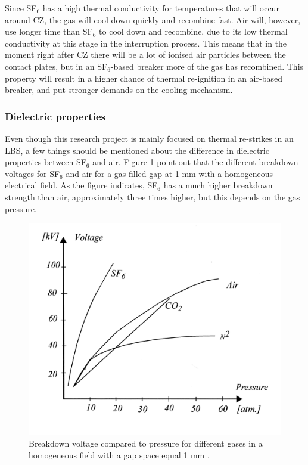 \documentclass[10pt,a4paper,twoside]{article}
\begin{document}
Since SF${_6}$ has a high thermal conductivity for temperatures that will occur around CZ, the gas will cool down quickly and recombine fast. Air will, however, use longer time than SF${_6}$ to cool down and recombine, due to its low thermal conductivity at this stage in the interruption process. This means that in the moment right after CZ there will be a lot of ionised air particles between the contact plates, but in an SF${_6}$-based breaker more of the gas has recombined. This property will result in a higher chance of thermal re-ignition in an air-based breaker, and put stronger demands on the cooling mechanism.

\subsubsection*{Dielectric properties} 

Even though this research project is mainly focused on thermal re-strikes in an LBS, a few things should be mentioned about the difference in dielectric properties between SF${_6}$ and air. Figure \ref{fig:breakDownVoltage} point out that the different breakdown voltages for SF$_6$ and air for a gas-filled gap at 1 mm with a homogeneous electrical field. As the figure indicates, SF$_6$ has a much higher breakdown strength than air, approximately three times higher, but this depends on the gas pressure.

\begin{figure}[H]
\centering
\includegraphics[scale=1]{Bilder/Discussion/Breakdown_voltage.png}
\caption{Breakdown voltage compared to pressure for different gases in a homogeneous field with a gap space equal 1 mm  \cite{bib:TET4160HVIM}.} \label{fig:breakDownVoltage}
\end{figure}
\end{document}
